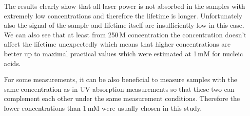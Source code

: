 The results clearly show that all laser power is not absorbed in the samples
with extremely low concentrations and therefore the lifetime is longer.
Unfortunately also the signal of the sample and lifetime itself are
insufficiently low in this case. We can also see that at least from
250\,M concentration the concentration doesn't affect the lifetime
unexpectedly which means that higher concentrations are better up to maximal
practical values which were estimated at 1\,mM for nucleic acids.

For some measurements, it can be also beneficial to measure samples with the
same concentration as in UV absorption measurements so that these two can
complement each other under the same measurement conditions. Therefore the
lower concentrations than 1\,mM were usually chosen in this study.